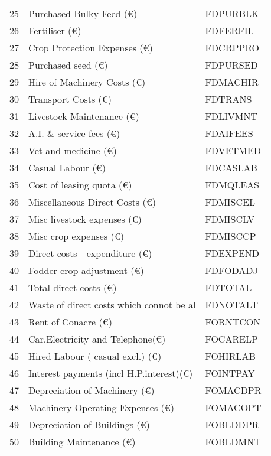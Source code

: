\documentclass{article}\usepackage{graphicx, color}
\begin{document}
\begin{flushleft}
\begin{table}[ht]
\begin{center}
\begin{tabular}{rll}
  25 & Purchased Bulky Feed        (€) & FDPURBLK \\ 
  26 & Fertiliser                  (€) & FDFERFIL \\ 
  27 & Crop Protection Expenses    (€) & FDCRPPRO \\ 
  28 & Purchased seed              (€) & FDPURSED \\ 
  29 & Hire of Machinery Costs     (€) & FDMACHIR \\ 
  30 & Transport Costs             (€) & FDTRANS \\ 
  31 & Livestock Maintenance       (€) & FDLIVMNT \\ 
  32 & A.I. \& service fees         (€) & FDAIFEES \\ 
  33 & Vet and medicine            (€) & FDVETMED \\ 
  34 & Casual Labour               (€) & FDCASLAB \\ 
  35 & Cost of leasing quota       (€) & FDMQLEAS \\ 
  36 & Miscellaneous Direct Costs  (€) & FDMISCEL \\ 
  37 & Misc livestock expenses     (€) & FDMISCLV \\ 
  38 & Misc crop expenses          (€) & FDMISCCP \\ 
  39 & Direct costs - expenditure  (€) & FDEXPEND \\ 
  40 & Fodder crop adjustment      (€) & FDFODADJ \\ 
  41 & Total direct costs          (€) & FDTOTAL \\ 
  42 & Waste of direct costs which connot be al & FDNOTALT \\ 
  43 & Rent of Conacre              (€) & FORNTCON \\ 
  44 & Car,Electricity and Telephone(€) & FOCARELP \\ 
  45 & Hired Labour ( casual excl.) (€) & FOHIRLAB \\ 
  46 & Interest payments (incl H.P.interest)(€) & FOINTPAY \\ 
  47 & Depreciation of Machinery    (€) & FOMACDPR \\ 
  48 & Machinery Operating Expenses (€) & FOMACOPT \\ 
  49 & Depreciation of Buildings    (€) & FOBLDDPR \\ 
  50 & Building Maintenance         (€) & FOBLDMNT \\ 
   \hline
\end{tabular}
\end{center}
\end{table}



\end{flushleft}
\end{document}
